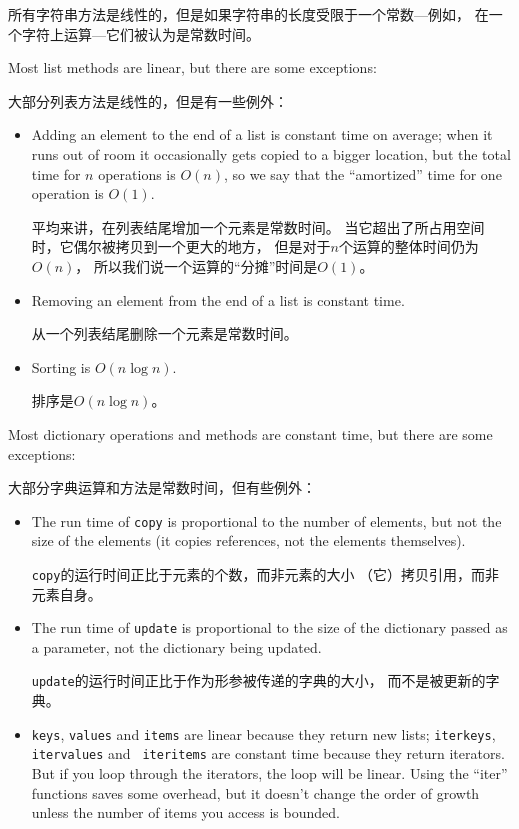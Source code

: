 \documentclass[10pt]{book}
\begin{document}
\begin{CJK}{UTF8}{gbsn}
所有字符串方法是线性的，但是如果字符串的长度受限于一个常数---例如，
在一个字符上运算---它们被认为是常数时间。

Most list methods are linear, but there are some exceptions:

大部分列表方法是线性的，但是有一些例外：

\begin{itemize}

\item Adding an element to the end of a list is constant time on
average; when it runs out of room it occasionally gets copied
to a bigger location, but the total time for $n$ operations
is $O(n)$, so we say that the ``amortized'' time for one
operation is $O(1)$.

平均来讲，在列表结尾增加一个元素是常数时间。
当它超出了所占用空间时，它偶尔被拷贝到一个更大的地方，
但是对于$n$个运算的整体时间仍为$O(n)$，
所以我们说一个运算的``分摊''时间是$O(1)$。

\item Removing an element from the end of a list is constant time.

从一个列表结尾删除一个元素是常数时间。

\item Sorting is $O(n \log n)$.

排序是$O(n \log n)$。

\end{itemize}

Most dictionary operations and methods are constant time, but
there are some exceptions:

大部分字典运算和方法是常数时间，但有些例外：

\begin{itemize}

\item The run time of {\tt copy} is proportional to the number of
  elements, but not the size of the elements (it copies references,
  not the elements themselves).
  
{\tt copy}的运行时间正比于元素的个数，而非元素的大小
（它）拷贝引用，而非元素自身。

\item The run time of {\tt update} is
  proportional to the size of the dictionary passed as a parameter,
  not the dictionary being updated.

{\tt update}的运行时间正比于作为形参被传递的字典的大小，
而不是被更新的字典。

\item {\tt keys}, {\tt values} and {\tt items} are linear because they
  return new lists; {\tt iterkeys}, {\tt itervalues} and {\tt
    iteritems} are constant time because they return iterators.  But
  if you loop through the iterators, the loop will be linear.  Using
  the ``iter'' functions saves some overhead, but it doesn't change
  the order of growth unless the number of items you access is
  bounded.


\end{itemize}
\end{CJK}
\end{document}
